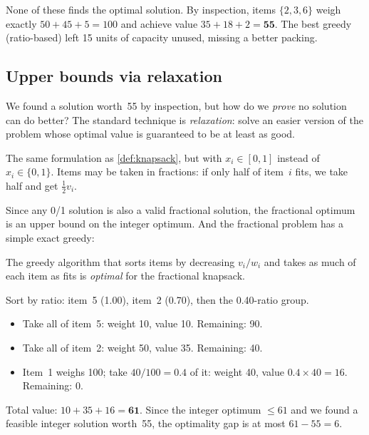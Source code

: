 \medskip\noindent
None of these finds the optimal solution.  By inspection, items
$\{2, 3, 6\}$ weigh exactly $50 + 45 + 5 = 100$ and achieve
value $35 + 18 + 2 = \mathbf{55}$.  The best greedy (ratio-based)
left 15 units of capacity unused, missing a better packing.

\subsection{Upper bounds via relaxation}
\label{ssec:knapsack-bound}

We found a solution worth~55 by inspection, but how do we
\emph{prove} no solution can do better?  The standard technique
is \emph{relaxation}: solve an easier version of the problem
whose optimal value is guaranteed to be at least as good.%

\begin{definition}
\label{def:fractional-knapsack}
The same formulation as \cref{def:knapsack}, but with
$x_i \in [0, 1]$ instead of $x_i \in \{0, 1\}$.
Items may be taken in fractions: if only half of item~$i$
fits, we take half and get $\tfrac{1}{2} v_i$.
\end{definition}

Since any 0/1 solution is also a valid fractional solution,
the fractional optimum is an upper bound on the integer optimum.
And the fractional problem has a simple exact greedy:

\begin{observation}
The greedy algorithm that sorts items by decreasing $v_i / w_i$
and takes as much of each item as fits is \emph{optimal}
for the fractional knapsack.
\end{observation}

\begin{example}
\label{ex:fractional-bound}
Sort by ratio: item~5 (1.00), item~2 (0.70), then the
0.40-ratio group.
\begin{itemize}[nosep]
  \item Take all of item~5: weight 10, value 10. Remaining: 90.
  \item Take all of item~2: weight 50, value 35. Remaining: 40.
  \item Item~1 weighs 100; take $40/100 = 0.4$ of it:
        weight 40, value $0.4 \times 40 = 16$.
        Remaining: 0.
\end{itemize}
Total value: $10 + 35 + 16 = \mathbf{61}$.
Since the integer optimum $\le 61$ and we found a feasible
integer solution worth~55, the optimality gap is at most
$61 - 55 = 6$.
\end{example}

